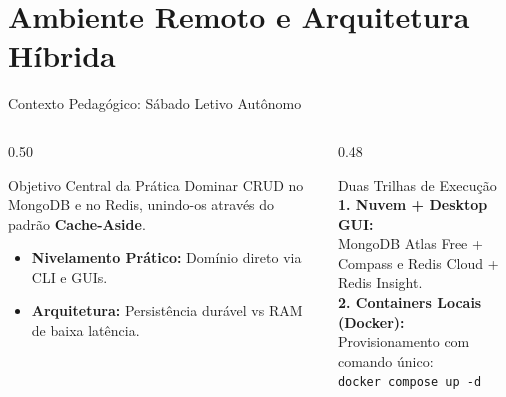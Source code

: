 \section{Ambiente Remoto e Arquitetura Híbrida}

\begin{frame}{Contexto Pedagógico: Sábado Letivo Autônomo}
  \begin{columns}[T]
    \begin{column}{0.50\textwidth}
      \begin{block}{Objetivo Central da Prática}
        {\footnotesize Dominar CRUD no MongoDB e no Redis, unindo-os através do padrão \textbf{Cache-Aside}.}
      \end{block}
      \vspace{0.2cm}
      {\footnotesize
      \begin{itemize}
        \item \textbf{Nivelamento Prático:} Domínio direto via CLI e GUIs.
        \item \textbf{Arquitetura:} Persistência durável vs RAM de baixa latência.
      \end{itemize}
      }
    \end{column}

    \begin{column}{0.48\textwidth}
      \begin{exampleblock}{Duas Trilhas de Execução}
        {\footnotesize
        \textbf{1. Nuvem + Desktop GUI:}\\
        MongoDB Atlas Free + Compass e Redis Cloud + Redis Insight.\\[6pt]
        \textbf{2. Containers Locais (Docker):}\\
        Provisionamento com comando único:\\[3pt]
        \centering\texttt{docker compose up -d}
        }
      \end{exampleblock}
    \end{column}
  \end{columns}
\end{frame}

